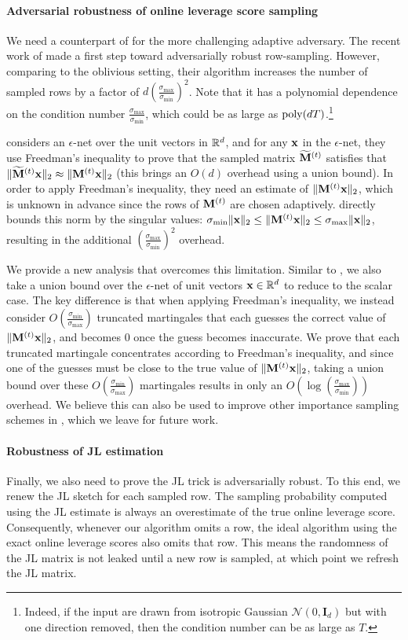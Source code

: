 \paragraph{Adversarial robustness of online leverage score sampling}  We need a counterpart of \cite{cmp20} for the more challenging adaptive adversary.
The recent work of \cite{bhm+21} made a first step toward adversarially robust row-sampling. However, comparing to the oblivious setting, their algorithm increases the number of sampled rows 
by a factor of $d (\frac{\sigma_{\max}}{\sigma_{\min}})^2$. Note that it has a polynomial dependence on the condition number $\frac{\sigma_{\max}}{\sigma_{\min}}$, which could be as large as $\operatorname{poly}(dT)$.\footnote{Indeed, if the input are drawn from isotropic Gaussian $\mathcal{N}(0, \mathbf{I}_d)$ but with one direction removed, then the condition number can be as large as $T$.}


\cite{bhm+21} considers an $\epsilon$-net over the unit vectors in $\mathbb{R}^d$, and for any $\mathbf{x}$ in the $\epsilon$-net, they use Freedman's inequality to prove that the sampled matrix $\widetilde{\mathbf{M}}^{(t)}$ satisfies that $\|\widetilde{\mathbf{M}}^{(t)} \mathbf{x}\|_2 \approx \|\mathbf{M}^{(t)} \mathbf{x}\|_2$ (this brings an $O(d)$ overhead using a union bound). In order to apply Freedman's inequality, they need an estimate of $\|\mathbf{M}^{(t)} \mathbf{x}\|_2$, which is unknown in advance since the rows of $\mathbf{M}^{(t)}$ are chosen adaptively. \cite{bhm+21} directly bounds this norm by the singular values: $\sigma_{\min} \|\mathbf{x}\|_2 \leq \|\mathbf{M}^{(t)} \mathbf{x}\|_2 \leq \sigma_{\max} \|\mathbf{x}\|_2$, resulting in the additional $(\frac{\sigma_{\max}}{\sigma_{\min}})^2$ overhead. 


We provide a new analysis that overcomes this limitation. Similar to \cite{bhm+21}, we also take a union bound over the $\epsilon$-net of unit vectors $\mathbf{x} \in \mathbb{R}^d$ to reduce to the scalar case. The key difference is that when applying Freedman's inequality, we instead consider $O(\frac{\sigma_{\min}}{\sigma_{\max}})$ truncated martingales that each guesses the correct value of $\|\mathbf{M}^{(t)} \mathbf{x}\|_2$, and becomes 0 once the guess becomes inaccurate. We prove that each truncated martingale concentrates according to Freedman's inequality, and since one of the guesses must be close to the true value of $\|\mathbf{M}^{(t)} \mathbf{x}\|_2$, taking a union bound over these $O(\frac{\sigma_{\min}}{\sigma_{\max}})$ martingales results in only an $O(\log(\frac{\sigma_{\max}}{\sigma_{\min}}))$ overhead. We believe this can also be used to improve other importance sampling schemes in \cite{bhm+21}, which we leave for future work. 

\paragraph{Robustness of JL estimation} Finally, we also need to prove the JL trick is adversarially robust. To this end, we renew the JL sketch for each sampled row. 
The sampling probability computed using the JL estimate is always an overestimate of the true online leverage score. Consequently, whenever our algorithm omits a row, the ideal algorithm using the exact online leverage scores also omits that row. This means the randomness of the JL matrix is not leaked until a new row is sampled, at which point we refresh the JL matrix.

